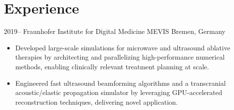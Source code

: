 \documentclass[english, print]{cv-style-wide}
\begin{document}

\section{Experience}
\vspace{-0.2cm}
\begin{entrylist}



\entry
  {2019--}
  {Fraunhofer Institute for Digital Medicine MEVIS}
  {Bremen, Germany}
  {
  \begin{itemize}[topsep=0pt]
\item Developed large-scale simulations for microwave and ultrasound ablative therapies by architecting and parallelizing high-performance numerical methods, enabling clinically relevant treatment planning at scale.
\item Engineered fast ultrasound beamforming algorithms and a transcranial acoustic/elastic propagation simulator by leveraging GPU-accelerated reconstruction techniques, delivering novel application.
  \end{itemize}}


\end{entrylist}
\end{document}
